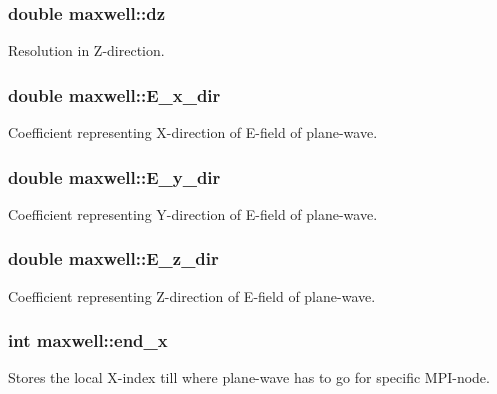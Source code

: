 \subsubsection[{\texorpdfstring{dz}{dz}}]{\setlength{\rightskip}{0pt plus 5cm}double maxwell\+::dz}\hypertarget{classmaxwell_a2b357e4d145be4296d1051c80f96b83a}{}\label{classmaxwell_a2b357e4d145be4296d1051c80f96b83a}
Resolution in Z-\/direction. 
\subsubsection[{\texorpdfstring{E\+\_\+x\+\_\+dir}{E_x_dir}}]{\setlength{\rightskip}{0pt plus 5cm}double maxwell\+::\+E\+\_\+x\+\_\+dir}\hypertarget{classmaxwell_a3a15355bece22428006a6278bdc48c6b}{}\label{classmaxwell_a3a15355bece22428006a6278bdc48c6b}
Coefficient representing X-\/direction of E-\/field of plane-\/wave. 
\subsubsection[{\texorpdfstring{E\+\_\+y\+\_\+dir}{E_y_dir}}]{\setlength{\rightskip}{0pt plus 5cm}double maxwell\+::\+E\+\_\+y\+\_\+dir}\hypertarget{classmaxwell_a124006b4e0392e25aa4f2710e6ef5d9a}{}\label{classmaxwell_a124006b4e0392e25aa4f2710e6ef5d9a}
Coefficient representing Y-\/direction of E-\/field of plane-\/wave. 
\subsubsection[{\texorpdfstring{E\+\_\+z\+\_\+dir}{E_z_dir}}]{\setlength{\rightskip}{0pt plus 5cm}double maxwell\+::\+E\+\_\+z\+\_\+dir}\hypertarget{classmaxwell_a91434ccd5f753f95e3d0d9f7dcb7c5da}{}\label{classmaxwell_a91434ccd5f753f95e3d0d9f7dcb7c5da}
Coefficient representing Z-\/direction of E-\/field of plane-\/wave. 
\subsubsection[{\texorpdfstring{end\+\_\+x}{end_x}}]{\setlength{\rightskip}{0pt plus 5cm}int maxwell\+::end\+\_\+x}\hypertarget{classmaxwell_ae9eb048f015df5a63df82e81a7992afa}{}\label{classmaxwell_ae9eb048f015df5a63df82e81a7992afa}
Stores the local X-\/index till where plane-\/wave has to go for specific M\+P\+I-\/node. 
